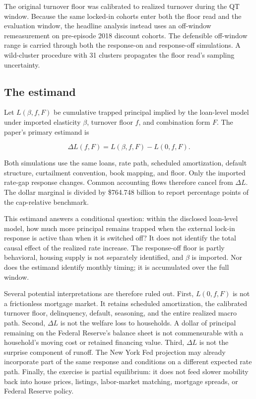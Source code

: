 The original turnover floor was calibrated to realized turnover during the QT window. Because the same locked-in cohorts enter both the floor read and the evaluation window, the headline analysis instead uses an off-window remeasurement on pre-episode 2018 discount cohorts. The defensible off-window range is carried through both the response-on and response-off simulations. A wild-cluster procedure with 31 clusters propagates the floor read's sampling uncertainty.

\subsection{The estimand}

Let $L(\beta,f,F)$ be cumulative trapped principal implied by the loan-level model under imported elasticity $\beta$, turnover floor $f$, and combination form $F$. The paper's primary estimand is

\begin{equation}
\Delta L(f,F)=L(\beta,f,F)-L(0,f,F).
\label{eq:marginal}
\end{equation}

Both simulations use the same loans, rate path, scheduled amortization, default structure, curtailment convention, book mapping, and floor. Only the imported rate-gap response changes. Common accounting flows therefore cancel from $\Delta L$. The dollar marginal is divided by \$764.748 billion to report percentage points of the cap-relative benchmark.

This estimand answers a conditional question: within the disclosed loan-level model, how much more principal remains trapped when the external lock-in response is active than when it is switched off? It does not identify the total causal effect of the realized rate increase. The response-off floor is partly behavioral, housing supply is not separately identified, and $\beta$ is imported. Nor does the estimand identify monthly timing; it is accumulated over the full window.

Several potential interpretations are therefore ruled out. First, $L(0,f,F)$ is not a frictionless mortgage market. It retains scheduled amortization, the calibrated turnover floor, delinquency, default, seasoning, and the entire realized macro path. Second, $\Delta L$ is not the welfare loss to households. A dollar of principal remaining on the Federal Reserve's balance sheet is not commensurable with a household's moving cost or retained financing value. Third, $\Delta L$ is not the surprise component of runoff. The New York Fed projection may already incorporate part of the same response and conditions on a different expected rate path. Finally, the exercise is partial equilibrium: it does not feed slower mobility back into house prices, listings, labor-market matching, mortgage spreads, or Federal Reserve policy.


